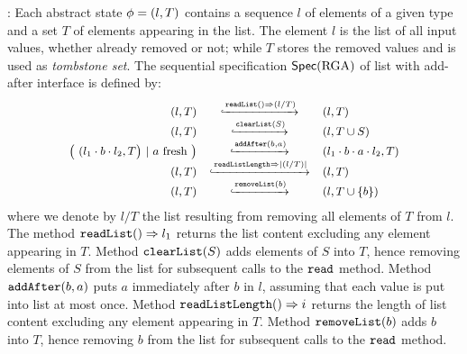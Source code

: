 : %
Each abstract state $\abstate = (l,T)$ contains a sequence $l$ of elements of a given type and a set $T$ of elements appearing in the list. The element $l$ is the list of all input values, whether already removed or not; while $T$ stores the removed values and is used as \emph{tombstone set}. The sequential specification $\specRGA$ of list with add-after interface is defined by: 
  \[\small
    \begin{array}{rcl}
      (l,T)
      & \specarrow{{\tt readList}()\Rightarrow (l/T)}
      & (l,T)\\
      (l,T)
      & \specarrow{{\tt clearList}(S)}
      & (l,T \cup S)\\ 
      \big(\ (l_1 \cdot b \cdot l_2,T\big)\ |\ a\text{ fresh}\ \big)
      & \specarrow{\alabelshort[\mathtt{addAfter}]{b,a}}
      & (l_1 \cdot b \cdot a \cdot l_2,T)\\
      (l,T)
      & \specarrow{{\tt readListLength}\Rightarrow \vert (l/T) \vert}
      & (l,T)\\ 
      (l,T)
      & \specarrow{{\tt removeList}(b)}
      & (l,T \cup \{ b \}) 
 \end{array}
\]
where we denote by $l/T$ the list resulting from removing all elements of $T$ from $l$. The method ${\tt readList}()\Rightarrow l_1$ returns the list content excluding any element appearing in $T$. Method ${\tt clearList}(S)$ adds elements of $S$ into $T$, hence removing elements of $S$ from the list for subsequent calls to the ${\tt read}$ method. Method ${\tt addAfter}(b,a)$ puts $a$ immediately after $b$ in $l$, assuming that each value is put into list at most once. Method ${\tt readListLength}()\Rightarrow i$ returns the length of list content excluding any element appearing in $T$. Method ${\tt removeList}(b)$ adds $b$ into $T$, hence removing $b$ from the list for subsequent calls to the ${\tt read}$ method. 




